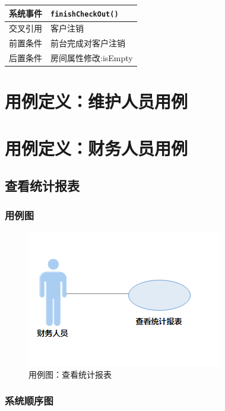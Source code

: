 \documentclass[black,normal,cn]{elegantnote}
\newcommand{\code}[1]{\colorbox{light-gray}{\texttt{#1}}}
\begin{document}
\begin{center}
    \begin{tabular}{|>{\centering}m{}|m{}|}
        \hline
        系统事件   & \multicolumn{1}{l|}{\code{finishCheckOut() }} \\
        \hline
        交叉引用   & 客户注销                                      \\
        \hline
        前置条件   & 前台完成对客户注销                            \\
        \hline
        {后置条件} & 房间属性修改:isEmpty                          \\
        \hline
    \end{tabular}
\end{center}

\section{用例定义：维护人员用例}

\section{用例定义：财务人员用例}
\subsection{查看统计报表}
\subsubsection{用例图}

\begin{figure}[H]
    \centering
    \includegraphics[width=.5\textwidth]{fig/276001.png}
    \caption{用例图：查看统计报表}
    \label{fig:276001}
\end{figure}

\subsubsection{系统顺序图}
\end{document}
